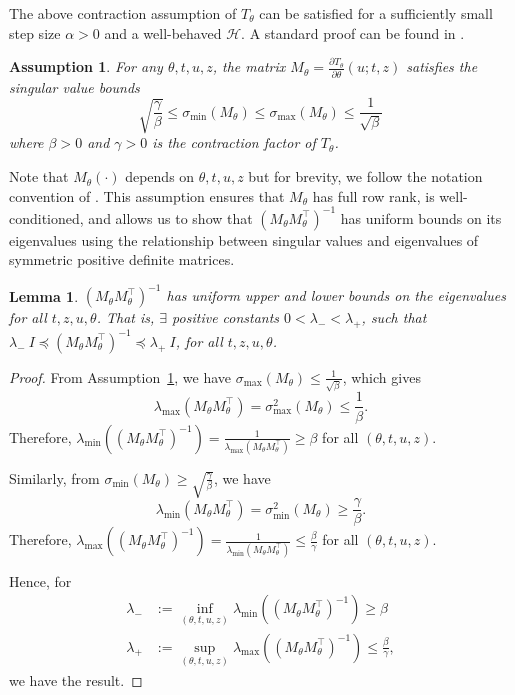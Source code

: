 \documentclass[letterpaper, 10 pt, conference]{ieeeconf}  %
\newtheorem{assumption}{Assumption}
\newtheorem{lemma}{Lemma}
\begin{document}
    The above contraction assumption of $T_\theta$ can be satisfied for a sufficiently small step size $\alpha > 0$ and a well-behaved $\mathcal{H}$. A standard proof can be found in \cite[Chapter 5]{beck2017first}. 

    \begin{assumption}
For any $\theta, t, u, z$, the matrix $M_\theta = \frac{\partial T_{\theta}}{\partial \theta}(u; t, z)$ satisfies the singular value bounds
\begin{equation*}
\sqrt{\frac{\gamma}{\beta}} \leq \sigma_{\min}(M_\theta) \leq \sigma_{\max}(M_\theta) \leq \frac{1}{\sqrt{\beta}}
\end{equation*}
where $\beta > 0$ and $\gamma > 0$ is the contraction factor of $T_\theta$.
\label{assumption_2}
\end{assumption}
    Note that $M_\theta(\cdot)$ depends on $\theta, t, u, z$ but for brevity, we follow the notation convention of \cite{fung2022jfb}. This assumption ensures that $M_\theta$ has full row rank, is well-conditioned, and allows us to show that $(M_\theta M_\theta^\top)^{-1}$ has uniform bounds on its eigenvalues using the relationship between singular values and eigenvalues of symmetric positive definite matrices.
    \begin{lemma}
    \label{lemma: lambdaA}
    $\left( M_\theta M_\theta^\top \right)^{-1}$ has uniform upper and lower bounds on the eigenvalues for all $t,z,u,\theta$. That is, $\exists$  positive constants $0< \lambda_- < \lambda_+$, such that $\lambda_{-} \: I \preceq \left( M_\theta M_\theta^\top \right)^{-1} \preceq \lambda_+ \: I$, for all $t,z,u,\theta$.
    \end{lemma}
    \begin{proof}
        From Assumption~\ref{assumption_2}, we have $\sigma_{\max}(M_\theta) \leq \frac{1}{\sqrt{\beta}}$, which gives
        $$\lambda_{\max}(M_\theta M_\theta^\top) = \sigma_{\max}^2(M_\theta) \leq \frac{1}{\beta}.$$
        Therefore, $\lambda_{\min}((M_\theta M_\theta^\top)^{-1}) = \frac{1}{\lambda_{\max}(M_\theta M_\theta^\top)} \geq \beta$ for all $(\theta, t, u, z)$.
        
        Similarly, from $\sigma_{\min}(M_\theta) \geq \sqrt{\frac{\gamma}{\beta}}$, we have
        $$\lambda_{\min}(M_\theta M_\theta^\top) = \sigma_{\min}^2(M_\theta) \geq \frac{\gamma}{\beta}.$$
        Therefore, $\lambda_{\max}((M_\theta M_\theta^\top)^{-1}) = \frac{1}{\lambda_{\min}(M_\theta M_\theta^\top)} \leq \frac{\beta}{\gamma}$ for all $(\theta, t, u, z)$.
        
        Hence, for
        \begin{align*}
        \lambda_- &:= \inf_{(\theta, t, u, z)} \lambda_{\min}((M_\theta M_\theta^\top)^{-1}) \geq \beta \\
        \lambda_+ &:= \sup_{(\theta, t, u, z)} \lambda_{\max}((M_\theta M_\theta^\top)^{-1}) \leq \frac{\beta}{\gamma},
        \end{align*}
        we have the result.
        \end{proof}
\end{document}
